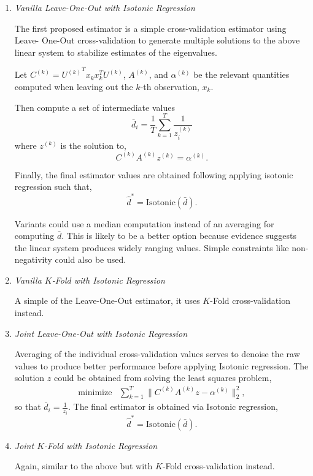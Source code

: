 \documentclass{article}
\begin{document}
\begin{enumerate}

\item \emph{Vanilla Leave-One-Out with Isotonic Regression}

The first proposed estimator is a simple cross-validation estimator using Leave-
One-Out cross-validation to generate multiple solutions to the above linear
system to stabilize estimates of the eigenvalues.

Let $C^{(k)} = {U^{(k)}}^T x_k x_k^T U^{(k)}$, $A^{(k)}$, and
$\alpha^{(k)}$ be the relevant quantities computed when leaving out the $k$-th
observation, $x_k$.

Then compute a set of intermediate values 
$$
	\bar{d}_i = \frac1T \sum_{k=1}^T \frac{1}{z_i^{(k)}}
$$
where $z^{(k)}$ is the solution to,
$$
	C^{(k)} A^{(k)} z^{(k)} = \alpha^{(k)}.
$$

Finally, the final estimator values are obtained following applying isotonic
regression such that,
$$
	\hat{d}^* = \mathrm{Isotonic}(\bar{d}).
$$

Variants could use a median computation instead of an averaging for computing
$\bar{d}$.  This is likely to be a better option because evidence suggests the
linear system produces widely ranging values.  Simple constraints like non-
negativity could also be used.

\item \emph{Vanilla $K$-Fold with Isotonic Regression}

A simple of the Leave-One-Out estimator, it uses $K$-Fold cross-validation
instead.

\item \emph{Joint Leave-One-Out with Isotonic Regression}

Averaging of the individual cross-validation values serves to denoise the raw
values to produce better performance before applying Isotonic regression.  The
solution $z$ could be obtained from solving the least squares problem,
$$
	\begin{array}{ll}
		\mbox{minimize} & \sum_{k=1}^T \| C^{(k)} A^{(k)} z - \alpha^{(k)} \|_2^2,
	\end{array}
$$
so that $\bar{d}_i = \frac{1}{z_i}$.  The final estimator is obtained via
Isotonic regression,
$$
	\hat{d}^* = \mathrm{Isotonic}(\bar{d}).
$$

\item \emph{Joint $K$-Fold with Isotonic Regression}

Again, similar to the above but with $K$-Fold cross-validation instead.


\end{enumerate}
\end{document}

